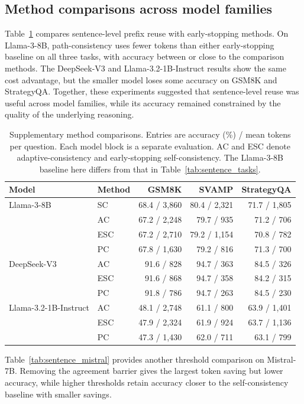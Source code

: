 \subsection{Method comparisons across model families}
Table~\ref{tab:sentence_models} compares sentence-level prefix reuse with early-stopping methods. On Llama-3-8B, path-consistency uses fewer tokens than either early-stopping baseline on all three tasks, with accuracy between or close to the comparison methods. The DeepSeek-V3 and Llama-3.2-1B-Instruct results show the same cost advantage, but the smaller model loses some accuracy on GSM8K and StrategyQA. Together, these experiments suggested that sentence-level reuse was useful across model families, while its accuracy remained constrained by the quality of the underlying reasoning.

\begin{table}[!htbp]
\centering\small
\caption{Supplementary method comparisons. Entries are accuracy (\%) / mean tokens per question. Each model block is a separate evaluation. AC and ESC denote adaptive-consistency and early-stopping self-consistency. The Llama-3-8B baseline here differs from that in Table~\ref{tab:sentence_tasks}.}
\label{tab:sentence_models}
\begin{tabular}{@{}llrrr@{}}
\toprule
Model & Method & GSM8K & SVAMP & StrategyQA\\
\midrule
Llama-3-8B~\citep{grattafiori2024llama3herdmodels} & SC & 68.4 / 3,860 & 80.4 / 2,321 & 71.7 / 1,805\\
& AC & 67.2 / 2,248 & 79.7 / 935 & 71.2 / 706\\
& ESC & 67.2 / 2,710 & 79.2 / 1,154 & 70.8 / 782\\
& PC & 67.8 / 1,630 & 79.2 / 816 & 71.3 / 700\\
\midrule
DeepSeek-V3~\citep{liu2024deepseek} & AC & 91.6 / 828 & 94.7 / 363 & 84.5 / 326\\
& ESC & 91.6 / 868 & 94.7 / 358 & 84.2 / 315\\
& PC & 91.8 / 786 & 94.7 / 263 & 84.5 / 230\\
\midrule
Llama-3.2-1B-Instruct & AC & 48.1 / 2,748 & 61.1 / 800 & 63.9 / 1,401\\
& ESC & 47.9 / 2,324 & 61.9 / 924 & 63.7 / 1,136\\
& PC & 47.3 / 1,430 & 62.0 / 711 & 63.1 / 799\\
\bottomrule
\end{tabular}
\end{table}

Table~\ref{tab:sentence_mistral} provides another threshold comparison on Mistral-7B. Removing the agreement barrier gives the largest token saving but lower accuracy, while higher thresholds retain accuracy closer to the self-consistency baseline with smaller savings.

